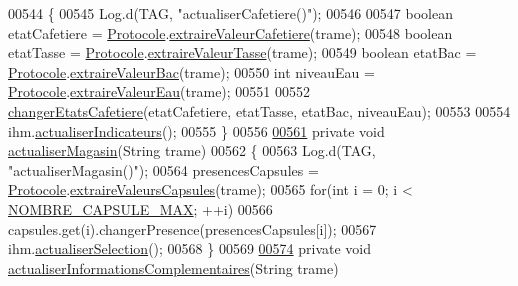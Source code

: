 \begin{DoxyCode}
00544     \{
00545         Log.d(TAG, \textcolor{stringliteral}{"actualiserCafetiere()"});
00546 
00547         \textcolor{keywordtype}{boolean} etatCafetiere = \hyperlink{classcom_1_1example_1_1ekawa_1_1_protocole}{Protocole}.\hyperlink{classcom_1_1example_1_1ekawa_1_1_protocole_abc2f21c6245695c5037bd0a2eac88799}{extraireValeurCafetiere}(trame);
00548         \textcolor{keywordtype}{boolean} etatTasse = \hyperlink{classcom_1_1example_1_1ekawa_1_1_protocole}{Protocole}.\hyperlink{classcom_1_1example_1_1ekawa_1_1_protocole_ae5e80461f082b4d2e469ee6841b9a380}{extraireValeurTasse}(trame);
00549         \textcolor{keywordtype}{boolean} etatBac = \hyperlink{classcom_1_1example_1_1ekawa_1_1_protocole}{Protocole}.\hyperlink{classcom_1_1example_1_1ekawa_1_1_protocole_a235ca0a3c40a50f4dc75346a60e54917}{extraireValeurBac}(trame);
00550         \textcolor{keywordtype}{int} niveauEau = \hyperlink{classcom_1_1example_1_1ekawa_1_1_protocole}{Protocole}.\hyperlink{classcom_1_1example_1_1ekawa_1_1_protocole_ad979442926a41d39052501267b5f5be3}{extraireValeurEau}(trame);
00551 
00552         \hyperlink{classcom_1_1example_1_1ekawa_1_1_cafetiere_a6fa4b1560875b71d339a9f6c24c5336d}{changerEtatsCafetiere}(etatCafetiere, etatTasse, etatBac, niveauEau);
00553 
00554         ihm.\hyperlink{classcom_1_1example_1_1ekawa_1_1_ihm_a2c3740dd5be20b3111b36649514fd41e}{actualiserIndicateurs}();
00555     \}
00556 
\hyperlink{classcom_1_1example_1_1ekawa_1_1_cafetiere_a406c04398043ee4abca9902828197d91}{00561}     \textcolor{keyword}{private} \textcolor{keywordtype}{void} \hyperlink{classcom_1_1example_1_1ekawa_1_1_cafetiere_a406c04398043ee4abca9902828197d91}{actualiserMagasin}(String trame)
00562     \{
00563         Log.d(TAG, \textcolor{stringliteral}{"actualiserMagasin()"});
00564         presencesCapsules = \hyperlink{classcom_1_1example_1_1ekawa_1_1_protocole}{Protocole}.\hyperlink{classcom_1_1example_1_1ekawa_1_1_protocole_ab9ea349bfe2b76585f8e71677cacd867}{extraireValeursCapsules}(trame);
00565         \textcolor{keywordflow}{for}(\textcolor{keywordtype}{int} i = 0; i < \hyperlink{classcom_1_1example_1_1ekawa_1_1_cafetiere_a183d96e89c056c4ac9c565bf8f24851e}{NOMBRE\_CAPSULE\_MAX}; ++i)
00566             capsules.get(i).changerPresence(presencesCapsules[i]);
00567         ihm.\hyperlink{classcom_1_1example_1_1ekawa_1_1_ihm_a2d7fd2fe397785acc2b9a32e65cfd52f}{actualiserSelection}();
00568     \}
00569 
\hyperlink{classcom_1_1example_1_1ekawa_1_1_cafetiere_af968afecce6625f466b145a54e8b1d44}{00574}     \textcolor{keyword}{private} \textcolor{keywordtype}{void} \hyperlink{classcom_1_1example_1_1ekawa_1_1_cafetiere_af968afecce6625f466b145a54e8b1d44}{actualiserInformationsComplementaires}(String trame)

\end{DoxyCode}
